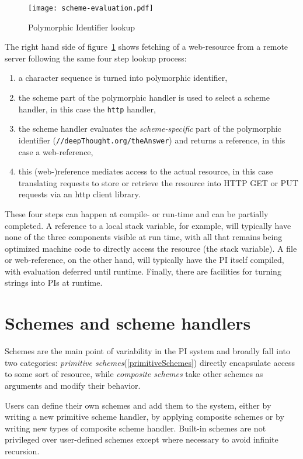 \documentclass[preprint,authoryear]{acm_proc_article-sp}
\begin{document}
\begin{figure}[htbp]
\label{scheme-eval}
\begin{center}
\texttt{[image: scheme-evaluation.pdf]}
\caption{Polymorphic Identifier lookup}
\end{center}
\end{figure}


The right hand side of figure~\ref{scheme-eval} shows fetching of a web-resource from
a remote server following the same four step lookup process:

\begin{enumerate}
\item a character sequence is turned into  polymorphic identifier,
\item the scheme part of the polymorphic handler is used to select a scheme handler, in this case the {\tt http} handler,
\item the scheme handler evaluates the {\em scheme-specific} part of the polymorphic identifier ({\tt //deepThought.org/theAnswer})
	 and returns a reference, in this case a web-reference,
\item this (web-)reference mediates access to the actual resource, in this case translating requests to store or retrieve the 
	resource into HTTP GET or PUT requests via an http client library.
\end{enumerate}

These four steps can happen at compile- or run-time and can be partially completed.
A reference to a local stack variable, for example, will typically have none of the
three components visible at run time, with all that remains being optimized 
machine code to directly access the resource (the stack variable).
A file or web-reference, on the other hand, will typically have the PI itself
compiled, with evaluation deferred until runtime.  Finally, there are facilities
for turning strings into PIs at runtime.


\section{Schemes and scheme handlers}
\label{schemes}
Schemes are the main point of variability in the PI system
and broadly fall into two categories:   {\em primitive schemes}(\ref{primitiveSchemes})
directly encapsulate access to some sort of resource, while {\em composite schemes} 
take other schemes as arguments and modify their behavior.


Users can define their own schemes and add them 
to the system, either by writing
a new primitive scheme handler, by applying composite schemes or by writing new types
of composite scheme handler.  Built-in schemes are not privileged over user-defined
schemes except where necessary to avoid infinite recursion.
\end{document}
